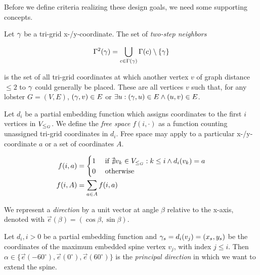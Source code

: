 Before we define criteria realizing these design goals, we need some supporting concepts.

Let $\gamma$ be a tri-grid x-/y-coordinate. The set of \emph{two-step neighbors}

\begin{equation*}
\Gamma^2(\gamma) = \bigcup\limits_{c \in \Gamma(\gamma)} \Gamma(c) \setminus \{ \gamma \}
\end{equation*}

is the set of all tri-grid coordinates at which another vertex $v$ of graph distance $\leq 2$ to $\gamma$ could generally be placed. These are all vertices $v$ such that, for any lobster $G = (V, E)$, $(\gamma, v) \in E$ or $\exists u: (\gamma, u) \in E \wedge (u, v) \in E$.

Let $d_i$ be a partial embedding function which assigns coordinates to the first $i$ vertices in $V_{\leq_G}$. We define the \emph{free space} $f(i, \cdot)$ as a function counting unassigned tri-grid coordinates in $d_i$. Free space may apply to a particular x-/y-coordinate $a$ or a set of coordinates $A$.

\begin{equation*}
\begin{aligned}
f(i, a) &= \begin{cases}1 & \text{ if } \nexists v_k \in V_{\leq_G}: k \leq i \wedge d_i(v_k) = a \\ 0 & \text{ otherwise} \end{cases}\\
f(i, A) &= \sum\limits_{a \in A} f(i, a)
\end{aligned}
\end{equation*}

We represent a \emph{direction} by a unit vector at angle $\beta$ relative to the x-axis, denoted with $\overrightarrow e(\beta) = (\cos \beta, \sin \beta)$.

Let $d_i, i > 0$ be a partial embedding function and $\gamma_s = d_i(v_j) = (x_s, y_s)$ be the coordinates of the maximum embedded spine vertex $v_j$, with index $j \leq i$. Then $\alpha \in \{ \overrightarrow e(-60^\circ), \overrightarrow e(0^\circ), \overrightarrow e(60^\circ) \}$ is the \emph{principal direction} in which we want to extend the spine.

